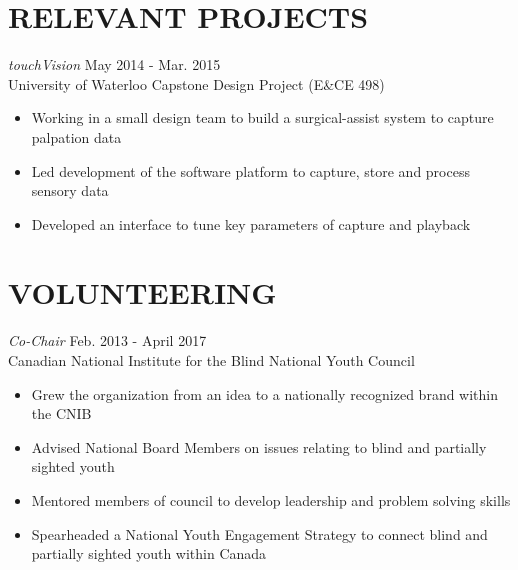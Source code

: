 \documentclass[margin]{res}
\begin{document}
\begin{resume}
\section{RELEVANT PROJECTS}
{\sl touchVision }
\hfill May 2014 - Mar. 2015\\
University of Waterloo Capstone Design Project (E\&CE 498)
\begin{itemize} \itemsep -2pt
    \item Working in a small design team to build a surgical-assist system to capture palpation data
    \item Led development of the software platform to capture, store and process sensory data
    \item Developed an interface to tune key parameters of capture and playback
\end{itemize}

\section{VOLUNTEERING}
{\sl Co-Chair} \hfill Feb. 2013 - April 2017\\
Canadian National Institute for the Blind National Youth Council
\begin{itemize} \itemsep -2pt
  \item Grew the organization from an idea to a nationally recognized brand within the CNIB
  \item Advised National Board Members on issues relating to blind and partially sighted youth
  \item Mentored members of council to develop leadership and problem solving skills
  \item Spearheaded a National Youth Engagement Strategy to connect blind and partially sighted youth within Canada
\end{itemize}


\end{resume}
\end{document}

